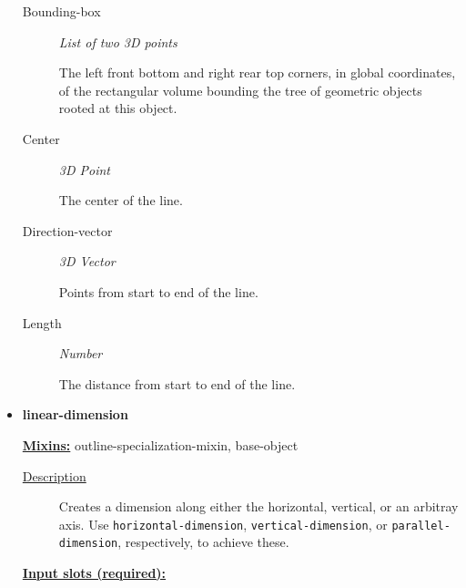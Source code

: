 \documentclass [11pt]{book}
\begin{document}
\begin{itemize}
\begin{description}
\item [Bounding-box]
\emph{List of two 3D points}

 The left front bottom and right rear top corners, in global coordinates,
of the rectangular volume bounding the tree of geometric objects rooted at this object.




\item [Center]
\emph{3D Point}

 The center of the line.




\item [Direction-vector]
\emph{3D Vector}

 Points from start to end of the line.




\item [Length]
\emph{Number}

 The distance from start to end of the line.




\end{description}







\item {}
\label{prim:linear-dimension}
\textbf{linear-dimension}


\textbf{
\underline{Mixins:}} outline-specialization-mixin, base-object





\begin{description}

\item [
\underline{Description}]


Creates a dimension along either the horizontal, vertical, or an arbitray axis. Use
\texttt{horizontal-dimension}, \texttt{vertical-dimension}, or \texttt{parallel-dimension}, respectively, to achieve these.



\end{description}








\textbf{
\underline{Input slots (required):}}

\begin{description}


\end{description}
\end{itemize}
\end{document}

